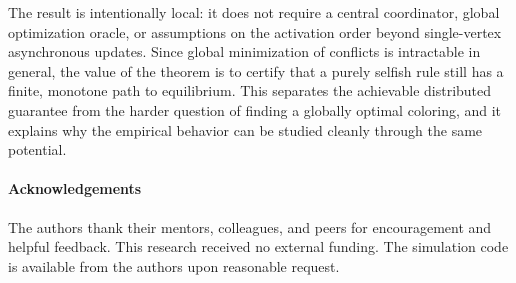 \documentclass[preprint,12pt]{elsarticle}
\begin{document}
The result is intentionally local: it does not require a central coordinator,
global optimization oracle, or assumptions on the activation order beyond
single-vertex asynchronous updates. Since global minimization of conflicts is
intractable in general, the value of the theorem is to certify that a purely
selfish rule still has a finite, monotone path to equilibrium. This separates
the achievable distributed guarantee from the harder question of finding a
globally optimal coloring, and it explains why the empirical behavior can be
studied cleanly through the same potential.

\paragraph*{Acknowledgements}
The authors thank their mentors, colleagues, and peers for encouragement and
helpful feedback. This research received no external funding. The simulation
code is available from the authors upon reasonable request.
\end{document}
